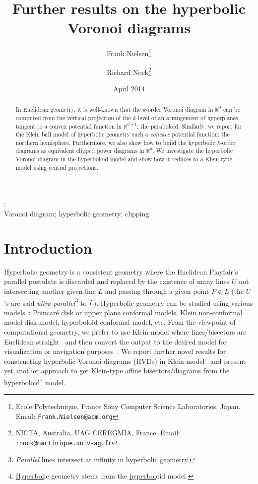 \documentclass[12pt]{article}
\def\bbR{\mathbb{R}}
\begin{document}
\title{Further results on the hyperbolic Voronoi diagrams}

\date{April 2014} 

\author{Frank Nielsen\thanks{Ecole Polytechnique, France 
Sony Computer Science Laboratories, Japan.
Email: {\tt Frank.Nielsen@acm.org}}
\and
Richard Nock\thanks{NICTA, Australia.
UAG CEREGMIA, France.
Email: {\tt rnock@martinique.univ-ag.fr}}
}

\maketitle


\begin{abstract}
In Euclidean geometry, it is well-known that the $k$-order Voronoi diagram in $\bbR^d$ can be computed from the vertical projection of the $k$-level of an arrangement of hyperplanes tangent to a convex potential function in $\bbR^{d+1}$: the paraboloid.
Similarly, we report  for the Klein ball model of hyperbolic geometry such a {\em concave} potential function: the northern hemisphere.
Furthermore, we also show how to build the hyperbolic $k$-order diagrams as  equivalent clipped power diagrams in $\bbR^d$.
We investigate the hyperbolic Voronoi diagram in the hyperboloid model and show how it reduces to a Klein-type model using central projections.
\end{abstract}

:\\
Voronoi diagram; hyperbolic geometry; clipping.
 


 



\section{Introduction}
Hyperbolic geometry is a consistent geometry where the Euclidean Playfair's parallel postulate is discarded and replaced by the existence of many lines $U$ not intersecting another given line $L$  and passing through a given point $P\not\in L$ (the $U$'s are said {\em ultra-parallel}\footnote{{\em Parallel} lines intersect at infinity in hyperbolic geometry.} to $L$).
Hyperbolic geometry can be studied using various models~\cite{VHVD-2014}: Poincar\'e disk or upper plane conformal models, Klein  non-conformal model disk model, hyperboloid conformal model, etc.
From the viewpoint of computational geometry, we prefer to use Klein model where lines/bisectors are Euclidean straight~\cite{HVDeasy-2010} and then convert the output to the desired model for visualization or navigation purposes~\cite{VHVD-2014}. 
We report further novel results for constructing hyperbolic Voronoi diagrams (HVDs) in Klein model~\cite{HVDeasy-2010} and present yet another approach to get Klein-type affine bisectors/diagrams from the hyperboloid\footnote{\underline{Hyperbol}ic geometry stems from the \underline{hyperbol}oid model.} model.
\end{document}
